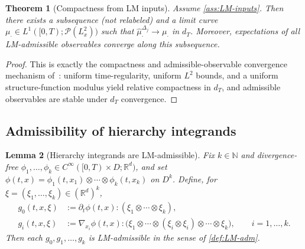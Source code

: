 \documentclass{article}
\numberwithin{equation}{section}
\theoremstyle{plain}
\newtheorem{theorem}{Theorem}[section]
\newtheorem{lemma}[theorem]{Lemma}
\theoremstyle{definition}
\theoremstyle{remark}
\newcommand{\N}{\mathbb{N}}
\newcommand{\R}{\mathbb{R}}
\newcommand{\Pcal}{\mathcal{P}}
\begin{document}
\begin{theorem}[Compactness from LM inputs]\label{thm:compact}
Assume \cref{ass:LM-inputs}. Then there exists a subsequence (not relabeled) and a limit curve
$\mu_\cdot\in L^1([0,T);\Pcal(L^2_x))$ such that $\widehat\mu^{\Delta_j}_\cdot\to\mu_\cdot$ in $d_T$.
Moreover, expectations of all LM-admissible observables converge along this subsequence.
\end{theorem}

\begin{proof}
This is exactly the compactness and admissible-observable convergence mechanism of~\cite{LMP2021}:
uniform time-regularity, uniform $L^2$ bounds, and a uniform structure-function modulus yield relative compactness in $d_T$,
and admissible observables are stable under $d_T$ convergence.
\end{proof}

\subsection{Admissibility of hierarchy integrands}

\begin{lemma}[Hierarchy integrands are LM-admissible]\label{lem:poly-adm}
Fix $k\in\N$ and divergence-free $\phi_1,\dots,\phi_k\in C^\infty([0,T)\times D;\R^d)$, and set
$\phi(t,x)=\phi_1(t,x_1)\otimes\cdots\otimes\phi_k(t,x_k)$ on $D^k$.
Define, for $\xi=(\xi_1,\dots,\xi_k)\in(\R^d)^k$,
\begin{align*}
g_0(t,x,\xi)
&:= \partial_t\phi(t,x):(\xi_1\otimes\cdots\otimes\xi_k),\\
g_i(t,x,\xi)
&:= \nabla_{x_i}\phi(t,x):\big(\xi_1\otimes\cdots\otimes(\xi_i\otimes\xi_i)\otimes\cdots\otimes\xi_k\big),
\qquad i=1,\dots,k.
\end{align*}
Then each $g_0,g_1,\dots,g_k$ is LM-admissible in the sense of \cref{def:LM-adm}.
\end{lemma}
\end{document}
